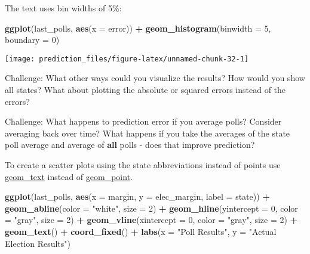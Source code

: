 \documentclass[]{book}
\newenvironment{Shaded}{\begin{snugshade}}{\end{snugshade}}
\newcommand{\KeywordTok}[1]{\textcolor[rgb]{0.13,0.29,0.53}{\textbf{#1}}}
\newcommand{\DataTypeTok}[1]{\textcolor[rgb]{0.13,0.29,0.53}{#1}}
\newcommand{\DecValTok}[1]{\textcolor[rgb]{0.00,0.00,0.81}{#1}}
\newcommand{\StringTok}[1]{\textcolor[rgb]{0.31,0.60,0.02}{#1}}
\newcommand{\OperatorTok}[1]{\textcolor[rgb]{0.81,0.36,0.00}{\textbf{#1}}}
\newcommand{\NormalTok}[1]{#1}
\theoremstyle{definition}
\theoremstyle{definition}
\theoremstyle{definition}
\theoremstyle{remark}
\begin{document}
The text uses bin widths of 5\%:

\begin{Shaded}
\begin{Highlighting}[]
\KeywordTok{ggplot}\NormalTok{(last_polls, }\KeywordTok{aes}\NormalTok{(}\DataTypeTok{x =}\NormalTok{ error)) }\OperatorTok{+}
\StringTok{  }\KeywordTok{geom_histogram}\NormalTok{(}\DataTypeTok{binwidth =} \DecValTok{5}\NormalTok{, }\DataTypeTok{boundary =} \DecValTok{0}\NormalTok{)}
\end{Highlighting}
\end{Shaded}

\begin{center}\texttt{[image: prediction\_files/figure-latex/unnamed-chunk-32-1]} \end{center}

Challenge: What other ways could you visualize the results? How would
you show all states? What about plotting the absolute or squared errors
instead of the errors?

Challenge: What happens to prediction error if you average polls?
Consider averaging back over time? What happens if you take the averages
of the state poll average and average of \textbf{all} polls - does that
improve prediction?

To create a scatter plots using the state abbreviations instead of
points use
\href{http://docs.ggplot2.org/current/geom_text.html}{geom\_text}
instead of
\href{http://docs.ggplot2.org/current/geom_point.html}{geom\_point}.

\begin{Shaded}
\begin{Highlighting}[]
\KeywordTok{ggplot}\NormalTok{(last_polls, }\KeywordTok{aes}\NormalTok{(}\DataTypeTok{x =}\NormalTok{ margin, }\DataTypeTok{y =}\NormalTok{ elec_margin, }\DataTypeTok{label =}\NormalTok{ state)) }\OperatorTok{+}
\StringTok{  }\KeywordTok{geom_abline}\NormalTok{(}\DataTypeTok{color =} \StringTok{"white"}\NormalTok{, }\DataTypeTok{size =} \DecValTok{2}\NormalTok{) }\OperatorTok{+}
\StringTok{  }\KeywordTok{geom_hline}\NormalTok{(}\DataTypeTok{yintercept =} \DecValTok{0}\NormalTok{, }\DataTypeTok{color =} \StringTok{"gray"}\NormalTok{, }\DataTypeTok{size =} \DecValTok{2}\NormalTok{) }\OperatorTok{+}
\StringTok{  }\KeywordTok{geom_vline}\NormalTok{(}\DataTypeTok{xintercept =} \DecValTok{0}\NormalTok{, }\DataTypeTok{color =} \StringTok{"gray"}\NormalTok{, }\DataTypeTok{size =} \DecValTok{2}\NormalTok{) }\OperatorTok{+}
\StringTok{  }\KeywordTok{geom_text}\NormalTok{() }\OperatorTok{+}
\StringTok{  }\KeywordTok{coord_fixed}\NormalTok{() }\OperatorTok{+}
\StringTok{  }\KeywordTok{labs}\NormalTok{(}\DataTypeTok{x =} \StringTok{"Poll Results"}\NormalTok{, }\DataTypeTok{y =} \StringTok{"Actual Election Results"}\NormalTok{)}
\end{Highlighting}
\end{Shaded}
\end{document}
